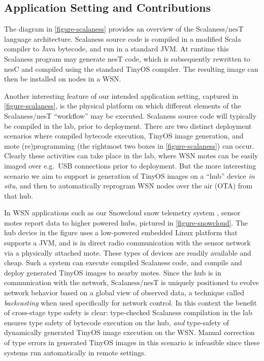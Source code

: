\subsection{Application Setting and Contributions}

\scalanessfig

The diagram in \autoref{figure-scalaness} provides an overview of the Scalaness/nesT language
architecture. Scalaness source code is compiled in a modified Scala compiler to Java bytecode,
and run in a standard JVM. At runtime this Scalaness program may generate nesT code, which is
subsequently rewritten to nesC and compiled using the standard TinyOS compiler. The resulting
image can then be installed on nodes in a WSN.
%

Another interesting feature of our intended application setting, captured in
\autoref{figure-scalaness}, is the physical platform on which different elements of the
Scalaness/nesT ``workflow'' may be executed. Scalaness source code will typically be compiled in
the lab, prior to deployment. There are two distinct deployment scenarios where compiled
bytecode execution, TinyOS image generation, and mote (re)programming (the rightmost two boxes
in \autoref{figure-scalaness}) can occur. Clearly these activities can take place in the lab,
where WSN motes can be easily imaged over e.g.~USB connections prior to deployment. But the more
interesting scenario we aim to support is generation of TinyOS images on a ``hub'' device
\emph{in situ}, and then to automatically reprogram WSN nodes over the air (OTA) from that hub.

In WSN applications such as our Snowcloud snow telemetry system
\cite{moeser-walker-skalka-frolik-wsc11,frolik-skalka-realwsn13}, sensor motes report data to
higher powered hubs, pictured in \autoref{figure-snowcloud}. The hub device in the figure uses a
low-powered embedded Linux platform that supports a JVM, and is in direct radio communication
with the sensor network via a physically attached mote. These types of devices are readily
available and cheap. Such a system can execute compiled Scalaness code, and compile and deploy
generated TinyOS images to nearby motes. Since the hub is in communication with the network,
Scalaness/nesT is uniquely positioned to evolve network behavior based on a global view of
observed data, a technique called \emph{backcasting} \cite{Willett:2004:BAS:984622.984641} when
used specifically for network control. In this context the benefit of cross-stage type safety is
clear: type-checked Scalaness compilation in the lab ensures type safety of bytecode execution
on the hub, \emph{and} type-safety of dynamically generated TinyOS image execution on the WSN.
Manual correction of type errors in generated TinyOS images in this scenario is infeasible since
these systems run automatically in remote settings.

